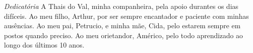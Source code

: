 \clearpage

\vspace*{0.75\textheight}

\begin{flushright}
  \emph{Dedicatória}
  A Thais do Val, minha companheira, pela apoio durantes os dias difíceis.
  Ao meu filho, Arthur, por ser sempre encantador e paciente com minhas ausências. 
	Ao meu pai, Petrucio, e minha mãe, Cida, pelo estarem sempre em postos quando preciso. 
	Ao meu orietandor, Américo, pelo todo aprendizado ao longo dos últimos 10 anos. 
\end{flushright}
